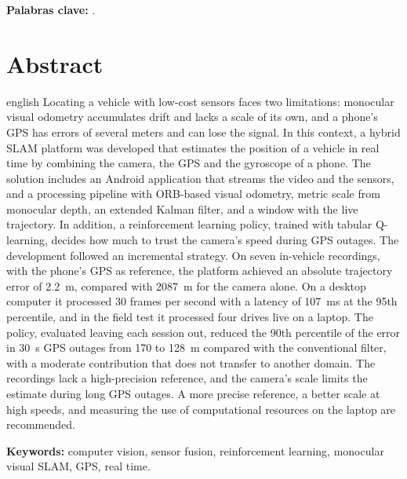 \textbf{Palabras clave:} \scriptKeywords.

\clearpage
\chapter*{Abstract}
\thispagestyle{empty}

\begin{otherlanguage*}{english}
Locating a vehicle with low-cost sensors faces two limitations: monocular visual odometry accumulates drift and lacks a scale of its own, and a phone's GPS has errors of several meters and can lose the signal.
In this context, a hybrid SLAM platform was developed that estimates the position of a vehicle in real time by combining the camera, the GPS and the gyroscope of a phone.
The solution includes an Android application that streams the video and the sensors, and a processing pipeline with ORB-based visual odometry, metric scale from monocular depth, an extended Kalman filter, and a window with the live trajectory.
In addition, a reinforcement learning policy, trained with tabular Q-learning, decides how much to trust the camera's speed during GPS outages.
The development followed an incremental strategy.
On seven in-vehicle recordings, with the phone's GPS as reference, the platform achieved an absolute trajectory error of 2.2~m, compared with 2087~m for the camera alone.
On a desktop computer it processed 30 frames per second with a latency of 107~ms at the 95th percentile, and in the field test it processed four drives live on a laptop.
The policy, evaluated leaving each session out, reduced the 90th percentile of the error in 30~s GPS outages from 170 to 128~m compared with the conventional filter, with a moderate contribution that does not transfer to another domain.
The recordings lack a high-precision reference, and the camera's scale limits the estimate during long GPS outages.
A more precise reference, a better scale at high speeds, and measuring the use of computational resources on the laptop are recommended.
\bigskip

\textbf{Keywords:} computer vision, sensor fusion, reinforcement learning, monocular visual SLAM, GPS, real time.
\end{otherlanguage*}

\cleardoublepage


